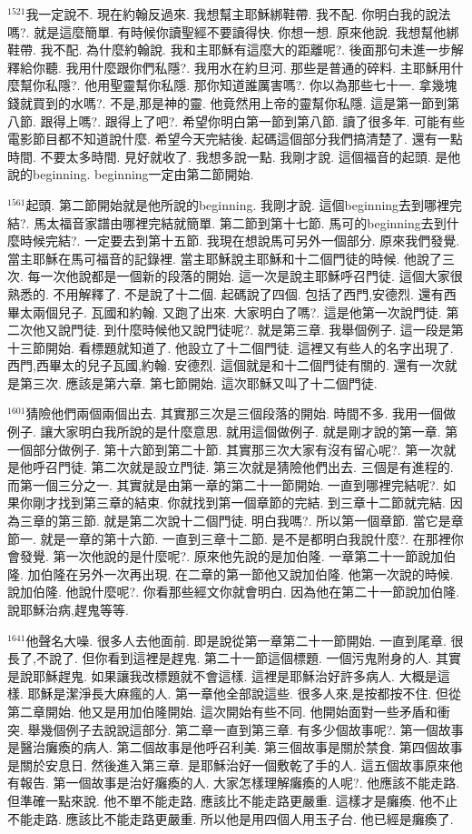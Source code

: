 \documentclass{book}
\begin{document}
$^{1521}$我一定說不.
現在約翰反過來.
我想幫主耶穌綁鞋帶.
我不配.
你明白我的說法嗎?.
就是這麼簡單.
有時候你讀聖經不要讀得快.
你想一想.
原來他說.
我想幫他綁鞋帶.
我不配.
為什麼約翰說.
我和主耶穌有這麼大的距離呢?.
後面那句未進一步解釋給你聽.
我用什麼跟你們私隱?.
我用水在約旦河.
那些是普通的碎料.
主耶穌用什麼幫你私隱?.
他用聖靈幫你私隱.
那你知道誰厲害嗎?.
你以為那些七十一.
拿幾塊錢就買到的水嗎?.
不是,那是神的靈.
他竟然用上帝的靈幫你私隱.
這是第一節到第八節.
跟得上嗎?.
跟得上了吧?.
希望你明白第一節到第八節.
讀了很多年.
可能有些電影節目都不知道說什麼.
希望今天完結後.
起碼這個部分我們搞清楚了.
還有一點時間.
不要太多時間.
見好就收了.
我想多說一點.
我剛才說.
這個福音的起頭.
是他說的beginning.
beginning一定由第二節開始.

$^{1561}$起頭.
第二節開始就是他所說的beginning.
我剛才說.
這個beginning去到哪裡完結?.
馬太福音家譜由哪裡完結就簡單.
第二節到第十七節.
馬可的beginning去到什麼時候完結?.
一定要去到第十五節.
我現在想說馬可另外一個部分.
原來我們發覺.
當主耶穌在馬可福音的記錄裡.
當主耶穌說主耶穌和十二個門徒的時候.
他說了三次.
每一次他說都是一個新的段落的開始.
這一次是說主耶穌呼召門徒.
這個大家很熟悉的.
不用解釋了.
不是說了十二個.
起碼說了四個.
包括了西門,安德烈.
還有西畢太兩個兒子.
瓦國和約翰.
又跑了出來.
大家明白了嗎?.
這是他第一次說門徒.
第二次他又說門徒.
到什麼時候他又說門徒呢?.
就是第三章.
我舉個例子.
這一段是第十三節開始.
看標題就知道了.
他設立了十二個門徒.
這裡又有些人的名字出現了.
西門,西畢太的兒子瓦國,約翰.
安德烈.
這個就是和十二個門徒有關的.
還有一次就是第三次.
應該是第六章.
第七節開始.
這次耶穌又叫了十二個門徒.

$^{1601}$猜險他們兩個兩個出去.
其實那三次是三個段落的開始.
時間不多.
我用一個做例子.
讓大家明白我所說的是什麼意思.
就用這個做例子.
就是剛才說的第一章.
第一個部分做例子.
第十六節到第二十節.
其實那三次大家有沒有留心呢?.
第一次就是他呼召門徒.
第二次就是設立門徒.
第三次就是猜險他們出去.
三個是有進程的.
而第一個三分之一.
其實就是由第一章的第二十一節開始.
一直到哪裡完結呢?.
如果你剛才找到第三章的結束.
你就找到第一個章節的完結.
到三章十二節就完結.
因為三章的第三節.
就是第二次說十二個門徒.
明白我嗎?.
所以第一個章節.
當它是章節一.
就是一章的第十六節.
一直到三章十二節.
是不是都明白我說什麼?.
在那裡你會發覺.
第一次他說的是什麼呢?.
原來他先說的是加伯隆.
一章第二十一節說加伯隆.
加伯隆在另外一次再出現.
在二章的第一節他又說加伯隆.
他第一次說的時候.
說加伯隆.
他說什麼呢?.
你看那些經文你就會明白.
因為他在第二十一節說加伯隆.
說耶穌治病,趕鬼等等.

$^{1641}$他聲名大噪.
很多人去他面前.
即是說從第一章第二十一節開始.
一直到尾章.
很長了,不說了.
但你看到這裡是趕鬼.
第二十一節這個標題.
一個污鬼附身的人.
其實是說耶穌趕鬼.
如果讓我改標題就不會這樣.
這裡是耶穌治好許多病人.
大概是這樣.
耶穌是潔淨長大麻瘋的人.
第一章他全部說這些.
很多人來,是按都按不住.
但從第二章開始.
他又是用加伯隆開始.
這次開始有些不同.
他開始面對一些矛盾和衝突.
舉幾個例子去說說這部分.
第二章一直到第三章.
有多少個故事呢?.
第一個故事是醫治癱瘓的病人.
第二個故事是他呼召利美.
第三個故事是關於禁食.
第四個故事是關於安息日.
然後進入第三章.
是耶穌治好一個敷乾了手的人.
這五個故事原來他有報告.
第一個故事是治好癱瘓的人.
大家怎樣理解癱瘓的人呢?.
他應該不能走路.
但準確一點來說.
他不單不能走路.
應該比不能走路更嚴重.
這樣才是癱瘓.
他不止不能走路.
應該比不能走路更嚴重.
所以他是用四個人用玉子台.
他已經是癱瘓了.
\end{document}
